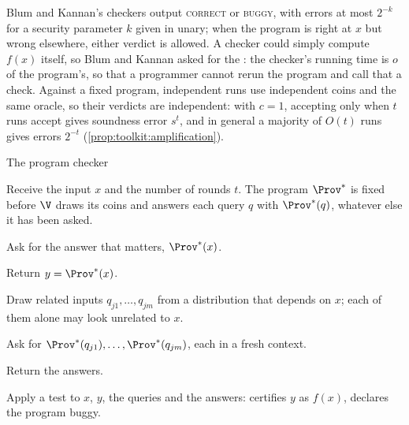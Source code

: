 \begin{refsection}
Blum and Kannan's checkers output \textsc{correct} or \textsc{buggy}, with errors at most $2^{-k}$ for a security parameter $k$ given in unary; when the program is right at $x$ but wrong elsewhere, either verdict is allowed. A checker could simply compute $f(x)$ itself, so Blum and Kannan asked for the : the checker's running time is $o$ of the program's, so that a programmer cannot rerun the program and call that a check. Against a fixed program, independent runs use independent coins and the same oracle, so their verdicts are independent: with $c=1$, accepting only when $t$ runs accept gives soundness error $s^t$, and in general a majority of $O(t)$ runs gives errors $2^{-t}$ (\cref{prop:toolkit:amplification}).

\begin{protocol}{The program checker}\label{prot:consistency:checker}
\item[\act{V}] Receive the input $x$ and the number of rounds $t$. The program $\Prov^*$ is fixed before $\V$ draws its coins and answers each query $q$ with $\Prov^*(q)$, whatever else it has been asked.
\item[\msg{V}{P}] Ask for the answer that matters, $\Prov^*(x)$.
\item[\msg{P}{V}] Return $y=\Prov^*(x)$.
\item[\act{V}] Draw related inputs $q_{j1},\dots,q_{jm}$ from a distribution that depends on $x$; each of them alone may look unrelated to $x$.
\item[\msg{V}{P}] Ask for $\Prov^*(q_{j1}),\dots,\Prov^*(q_{jm})$, each in a fresh context.
\item[\msg{P}{V}] Return the answers.
\item[\act{V}] Apply a test to $x$, $y$, the queries and the answers: \acc{} certifies $y$ as $f(x)$, \rej{} declares the program buggy.
\end{protocol}


\end{refsection}
